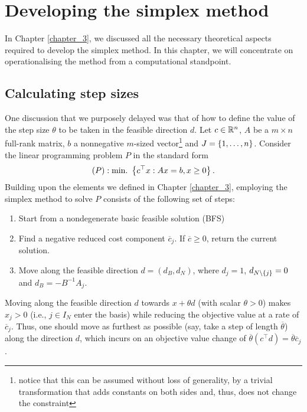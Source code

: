 \section{Developing the simplex method}

In Chapter \ref{chapter_3}, we discussed all the necessary theoretical aspects required to develop the simplex method. In this chapter, we will concentrate on operationalising the method from a computational standpoint.

\subsection{Calculating step sizes}

One discussion that we purposely delayed was that of how to define the value of the step size $\theta$ to be taken in the feasible direction $d$. Let $c \in \mathbb{R}^n$, $A$ be a $m \times n$ full-rank matrix, $b$ a nonnegative $m$-sized vector\footnote{notice that this can be assumed without loss of generality, by a trivial transformation that adds constants on both sides and, thus, does not change the constraint} and $J = \left\{ 1,\dots,n \right \}$. Consider the linear programming problem $P$ in the standard form 
%
	\begin{equation*}
		(P) : \mathop{\text{min.~}}\left\{ c^\top x : Ax = b, x \geq 0 \right \}.
	\end{equation*}
%
Building upon the elements we defined in Chapter \ref{chapter_3}, employing the simplex method to solve $P$ consists of the following set of steps:
%
\begin{enumerate}
	\item Start from a nondegenerate basic feasible solution (BFS)
	\item Find a negative reduced cost component $\overline{c}_j$. If $\overline{c} \geq 0$, return the current solution. 
	\item Move along the feasible direction $d = (d_B, d_N)$, where $d_j = 1$, $d_{N \setminus \left\{ j \right \}} = 0$ and $d_B = -B^{-1}A_j$.
\end{enumerate}
%
Moving along the feasible direction $d$ towards $x + \theta d$ (with scalar $\theta > 0$) makes $x_j >0$ (i.e., $j \in I_N$ enter the basis) while reducing the objective value at a rate of $\overline{c}_j$. Thus, one should move as furthest as possible (say, take a step of length $\overline{\theta}$) along the direction $d$, which incurs on an objective value change of $\overline{\theta} (c^\top d) = \overline{\theta} \overline{c}_j$.

